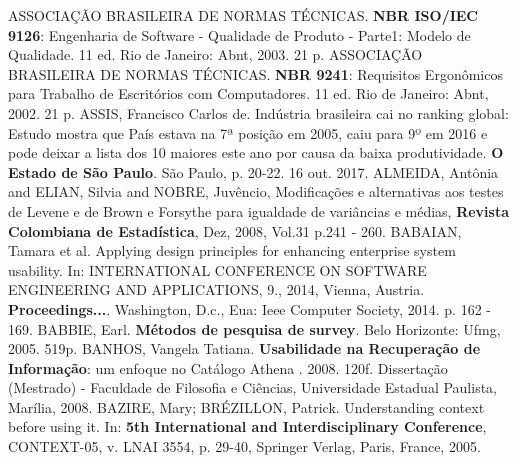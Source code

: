 \bibsection
\noindent
ASSOCIAÇÃO BRASILEIRA DE NORMAS TÉCNICAS. \textbf{NBR ISO/IEC 9126}: Engenharia de Software - Qualidade de Produto - Parte1: Modelo de Qualidade. 11 ed. Rio de Janeiro: Abnt, 2003. 21 p.
\newline
\newline
\noindent
ASSOCIAÇÃO BRASILEIRA DE NORMAS TÉCNICAS. \textbf{NBR 9241}: Requisitos Ergonômicos para Trabalho de Escritórios com Computadores. 11 ed. Rio de Janeiro: Abnt, 2002. 21 p.
\newline
\newline
\noindent
ASSIS, Francisco Carlos de. Indústria brasileira cai no ranking global: Estudo mostra que País estava na 7ª posição em 2005, caiu para 9º em 2016 e pode deixar a lista dos 10 maiores este ano por causa da baixa produtividade. \textbf{O Estado de São Paulo}. São Paulo, p. 20-22. 16 out. 2017.
\newline
\newline
\noindent 
ALMEIDA, Antônia and ELIAN, Silvia and NOBRE, Juvêncio, Modificações e alternativas aos testes de Levene e de Brown e Forsythe para igualdade de variâncias e médias, \textbf{Revista Colombiana de Estadística}, Dez, 2008, Vol.31 p.241 - 260.
\newline
\newline
\noindent 
BABAIAN, Tamara et al. Applying design principles for enhancing enterprise system usability. In: INTERNATIONAL CONFERENCE ON SOFTWARE ENGINEERING AND APPLICATIONS, 9., 2014, Vienna, Austria. \textbf{Proceedings...}. Washington, D.c., Eua: Ieee Computer Society, 2014. p. 162 - 169.
\newline
\newline
\noindent 
BABBIE, Earl. \textbf{Métodos de pesquisa de survey}. Belo Horizonte: Ufmg, 2005. 519p.
\newline
\newline
\noindent 
BANHOS, Vangela Tatiana. \textbf{Usabilidade na Recuperação de Informação}: um enfoque no Catálogo Athena . 2008. 120f. Dissertação (Mestrado) - Faculdade de Filosofia e Ciências, Universidade Estadual Paulista, Marília, 2008.
\newline
\newline
\noindent
BAZIRE, Mary; BRÉZILLON, Patrick. Understanding context before using it. In: \textbf{5th International and Interdisciplinary Conference}, CONTEXT-05, v. LNAI 3554, p. 29-40, Springer Verlag, Paris, France, 2005.
\newline
